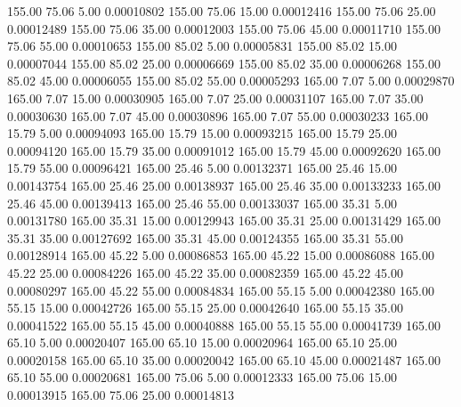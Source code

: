     155.00     75.06      5.00     0.00010802
    155.00     75.06     15.00     0.00012416
    155.00     75.06     25.00     0.00012489
    155.00     75.06     35.00     0.00012003
    155.00     75.06     45.00     0.00011710
    155.00     75.06     55.00     0.00010653
    155.00     85.02      5.00     0.00005831
    155.00     85.02     15.00     0.00007044
    155.00     85.02     25.00     0.00006669
    155.00     85.02     35.00     0.00006268
    155.00     85.02     45.00     0.00006055
    155.00     85.02     55.00     0.00005293
    165.00      7.07      5.00     0.00029870
    165.00      7.07     15.00     0.00030905
    165.00      7.07     25.00     0.00031107
    165.00      7.07     35.00     0.00030630
    165.00      7.07     45.00     0.00030896
    165.00      7.07     55.00     0.00030233
    165.00     15.79      5.00     0.00094093
    165.00     15.79     15.00     0.00093215
    165.00     15.79     25.00     0.00094120
    165.00     15.79     35.00     0.00091012
    165.00     15.79     45.00     0.00092620
    165.00     15.79     55.00     0.00096421
    165.00     25.46      5.00     0.00132371
    165.00     25.46     15.00     0.00143754
    165.00     25.46     25.00     0.00138937
    165.00     25.46     35.00     0.00133233
    165.00     25.46     45.00     0.00139413
    165.00     25.46     55.00     0.00133037
    165.00     35.31      5.00     0.00131780
    165.00     35.31     15.00     0.00129943
    165.00     35.31     25.00     0.00131429
    165.00     35.31     35.00     0.00127692
    165.00     35.31     45.00     0.00124355
    165.00     35.31     55.00     0.00128914
    165.00     45.22      5.00     0.00086853
    165.00     45.22     15.00     0.00086088
    165.00     45.22     25.00     0.00084226
    165.00     45.22     35.00     0.00082359
    165.00     45.22     45.00     0.00080297
    165.00     45.22     55.00     0.00084834
    165.00     55.15      5.00     0.00042380
    165.00     55.15     15.00     0.00042726
    165.00     55.15     25.00     0.00042640
    165.00     55.15     35.00     0.00041522
    165.00     55.15     45.00     0.00040888
    165.00     55.15     55.00     0.00041739
    165.00     65.10      5.00     0.00020407
    165.00     65.10     15.00     0.00020964
    165.00     65.10     25.00     0.00020158
    165.00     65.10     35.00     0.00020042
    165.00     65.10     45.00     0.00021487
    165.00     65.10     55.00     0.00020681
    165.00     75.06      5.00     0.00012333
    165.00     75.06     15.00     0.00013915
    165.00     75.06     25.00     0.00014813
